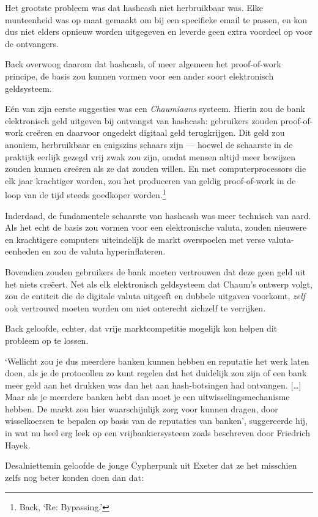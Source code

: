 \documentclass[smalldemyvopaper,11pt,twoside,onecolumn,openright,extrafontsizes,hidelinks]{memoir}
\begin{document}
Het grootste probleem was dat hashcash niet herbruikbaar was. Elke
munteenheid was op maat gemaakt om bij een specifieke email te passen,
en kon dus niet elders opnieuw worden uitgegeven en leverde geen extra
voordeel op voor de ontvangers.

Back overwoog daarom dat hashcash, of meer algemeen het proof-of-work
principe, de basis zou kunnen vormen voor een ander soort elektronisch
geldsysteem.

Eén van zijn eerste suggesties was een \emph{Chaumiaans} systeem. Hierin
zou de bank elektronisch geld uitgeven bij ontvangst van hashcash:
gebruikers zouden proof-of-work creëren en daarvoor ongedekt digitaal
geld terugkrijgen. Dit geld zou anoniem, herbruikbaar en enigszins
schaars zijn --- hoewel de schaarste in de praktijk eerlijk gezegd vrij
zwak zou zijn, omdat mensen altijd meer bewijzen zouden kunnen creëren
als ze dat zouden willen. En met computerprocessors die elk jaar
krachtiger worden, zou het produceren van geldig proof-of-work in de
loop van de tijd steeds goedkoper worden.\footnote{Back, `Re:
  Bypassing.'}

Inderdaad, de fundamentele schaarste van hashcash was meer technisch van
aard. Als het echt de basis zou vormen voor een elektronische valuta,
zouden nieuwere en krachtigere computers uiteindelijk de markt
overspoelen met verse valuta-eenheden en zou de valuta hyperinflateren.

Bovendien zouden gebruikers de bank moeten vertrouwen dat deze geen geld
uit het niets creëert. Net als elk elektronisch geldsysteem dat Chaum's
ontwerp volgt, zou de entiteit die de digitale valuta uitgeeft en
dubbele uitgaven voorkomt, \emph{zelf} ook vertrouwd moeten worden om
niet onterecht zichzelf te verrijken.

Back geloofde, echter, dat vrije marktcompetitie mogelijk kon helpen dit
probleem op te lossen.

`Wellicht zou je dus meerdere banken kunnen hebben en reputatie het werk
laten doen, als je de protocollen zo kunt regelen dat het duidelijk zou
zijn of een bank meer geld aan het drukken was dan het aan
hash-botsingen had ontvangen. {[}\ldots{]} Maar als je meerdere banken
hebt dan moet je een uitwisselingsmechanisme hebben. De markt zou hier
waarschijnlijk zorg voor kunnen dragen, door wisselkoersen te bepalen op
basis van de reputaties van banken', suggereerde hij, in wat nu heel erg
leek op een vrijbankiersysteem zoals beschreven door Friedrich Hayek.

Desalniettemin geloofde de jonge Cypherpunk uit Exeter dat ze het
misschien zelfs nog beter konden doen dan dat:
\end{document}
